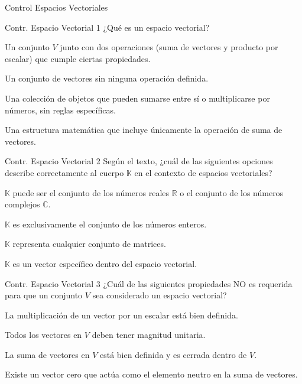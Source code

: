 \documentclass[a4,11pt]{aleph-notas}
\begin{document}
\begin{quiz}{Control Espacios Vectoriales}

\begin{multi}{Contr. Espacio Vectorial 1}%
    {¿Qué es un espacio vectorial?}
    \item* Un conjunto $V$ junto con dos operaciones (suma de vectores y producto por escalar) que cumple ciertas propiedades.
    \item Un conjunto de vectores sin ninguna operación definida.
    \item Una colección de objetos que pueden sumarse entre sí o multiplicarse por números, sin reglas específicas.
    \item Una estructura matemática que incluye únicamente la operación de suma de vectores.
\end{multi}

\begin{multi}{Contr. Espacio Vectorial 2}%
    {Según el texto, ¿cuál de las siguientes opciones describe correctamente al cuerpo $\mathbb{K}$ en el contexto de espacios vectoriales?}
    \item* $\mathbb{K}$ puede ser el conjunto de los números reales $\mathbb{R}$ o el conjunto de los números complejos $\mathbb{C}$.
    \item $\mathbb{K}$ es exclusivamente el conjunto de los números enteros.
    \item $\mathbb{K}$ representa cualquier conjunto de matrices.
    \item $\mathbb{K}$ es un vector específico dentro del espacio vectorial.
\end{multi}

\begin{multi}{Contr. Espacio Vectorial 3}%
    {¿Cuál de las siguientes propiedades NO es requerida para que un conjunto $V$ sea considerado un espacio vectorial?}
    \item La multiplicación de un vector por un escalar está bien definida.
    \item* Todos los vectores en $V$ deben tener magnitud unitaria.
    \item La suma de vectores en $V$ está bien definida y es cerrada dentro de $V$.
    \item Existe un vector cero que actúa como el elemento neutro en la suma de vectores.
\end{multi}


\end{quiz}
\end{document}

